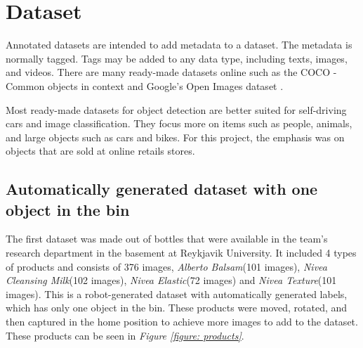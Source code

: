 \section{Dataset}
Annotated datasets are intended to add metadata to a dataset. The metadata is normally tagged. Tags may be added to any data type, including texts, images, and videos. There are many ready-made datasets online such as the COCO - Common objects in context \cite{noauthor_what_nodate} and Google’s Open Images dataset \cite{noauthor_open_nodate}.

Most ready-made datasets for object detection are better suited for self-driving cars and image classification. They focus more on items such as people, animals, and large objects such as cars and bikes. For this project, the emphasis was on objects that are sold at online retails stores.

\subsection{Automatically generated dataset with one object in the bin} \label{sec:firstdataset}
The first dataset was made out of bottles that were available in the team’s research department in the basement at Reykjavik University. It included 4 types of products and consists of 376 images, \textit{Alberto Balsam}(101 images), \textit{Nivea Cleansing Milk}(102 images), \textit{Nivea Elastic}(72 images) and \textit{Nivea Texture}(101 images). 
This is a robot-generated dataset with automatically generated labels, which has only one object in the bin. 
These products were moved, rotated, and then captured in the home position to achieve more images to add to the dataset. 
These products can be seen in \textit{Figure \ref{figure: products}}.

